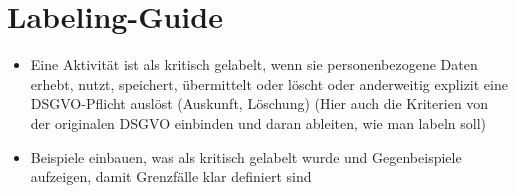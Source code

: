 \section{Labeling-Guide}\label{sec:labeling-guide}

\begin{itemize}
    \item Eine Aktivität ist als kritisch gelabelt, wenn sie personenbezogene Daten erhebt, nutzt, speichert, übermittelt oder löscht oder anderweitig explizit eine DSGVO-Pflicht auslöst (Auskunft, Löschung) (Hier auch die Kriterien von der originalen DSGVO einbinden und daran ableiten, wie man labeln soll)
    \item Beispiele einbauen, was als kritisch gelabelt wurde und Gegenbeispiele aufzeigen, damit Grenzfälle klar definiert sind
\end{itemize}